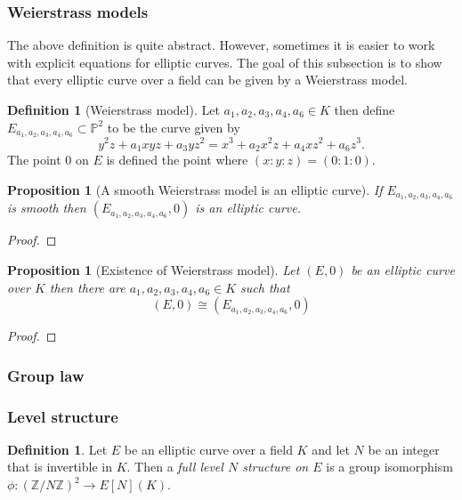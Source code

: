 \documentclass[a4paper,12pt,reqno]{amsart}
\newcommand{\field}[1]{\mathbb{#1}}  %
\newcommand{\Z}{\field{Z}} %
\renewcommand{\P}{\field{P}}
\newtheorem{proposition}[lemma]{Proposition}
\theoremstyle{definition}
\newtheorem{definition}[lemma]{Definition}
\numberwithin{lemma}{section}
\numberwithin{equation}{section}
\numberwithin{figure}{section}
\begin{document}
\subsubsection{Weierstrass models}\label{sec:weierstrass-over-K}
The above definition is quite abstract. However, sometimes it is easier to work with explicit equations for elliptic curves. The goal of this subsection is to show that every elliptic curve over a field can be given by a Weierstrass model.

\begin{definition}[Weierstrass model]\label{def:weierstrass-model-over-K}
Let $a_1,a_2,a_3,a_4,a_6 \in K$ then define $E_{a_1,a_2,a_3,a_4,a_6} \subset \P^2$ to be the curve given by
$$y^2z+ a_1xyz+a_3yz^2=x^3+a_2x^2z+a_4xz^2+a_6z^3.$$
The point $0$ on $E$ is defined the point where $(x:y:z) = (0:1:0)$.
\end{definition}

\begin{proposition}[A smooth Weierstrass model is an elliptic curve]\label{stmt:smooth-weierstrass-over-k-is-ec}
If $E_{a_1,a_2,a_3,a_4,a_6}$ is smooth then $(E_{a_1,a_2,a_3,a_4,a_6},0)$ is an elliptic curve.
\end{proposition}
\begin{proof}
\end{proof}

\begin{proposition}[Existence of Weierstrass model]\label{stmt:ec-over-k-has-weierstrass-model}
Let $(E,0)$ be an elliptic curve over $K$ then there are $a_1,a_2,a_3,a_4,a_6 \in K$ such that 
$$(E,0) \cong (E_{a_1,a_2,a_3,a_4,a_6},0)$$
\end{proposition}
\begin{proof}
\end{proof}


\subsubsection{Group law}

\subsubsection{Level structure}

\begin{definition}
Let $E$ be an elliptic curve over a field $K$ and let $N$ be an integer that is invertible in $K$. Then a \textit{full level $N$ structure on $E$} is a group isomorphism $\phi: (\Z/N\Z)^2 \to  E[N](K)$. 
\end{definition}
\end{document}
